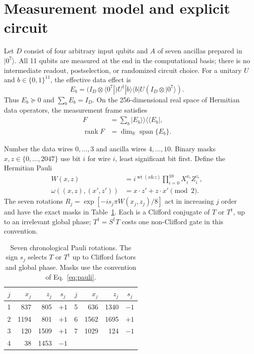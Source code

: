 \documentclass[aps,pra,reprint,floatfix,superscriptaddress,nofootinbib]{revtex4-2}
\newcommand{\rank}{\operatorname{rank}}
\newcommand{\Span}{\operatorname{span}}
\begin{document}
\section{Measurement model and explicit circuit}

Let $D$ consist of four arbitrary input qubits and $A$ of seven ancillas prepared in $|0^7\rangle$. All 11 qubits are measured at the end in the computational basis; there is no intermediate readout, postselection, or randomized circuit choice. For a unitary $U$ and $b\in\{0,1\}^{11}$, the effective data effect is
\begin{equation}
 E_b=(I_D\otimes\langle0^7|)U^\dagger|b\rangle\langle b|U(I_D\otimes|0^7\rangle).
 \label{eq:effect}
\end{equation}
Thus $E_b\succeq0$ and $\sum_bE_b=I_D$. On the 256-dimensional real space of Hermitian data operators, the measurement frame satisfies
\begin{equation}
\begin{aligned}
 F&=\sum_b|E_b\rangle\!\rangle\langle\!\langle E_b|,\\
 \rank F&=\dim_{\mathbb R}\Span\{E_b\}.
\end{aligned}
\label{eq:frame}
\end{equation}

Number the data wires $0,\ldots,3$ and ancilla wires $4,\ldots,10$. Binary masks $x,z\in\{0,\ldots,2047\}$ use bit $i$ for wire $i$, least significant bit first. Define the Hermitian Pauli
\begin{equation}
\begin{aligned}
 W(x,z)&=i^{\operatorname{wt}(x\mathbin{\&}z)}
          \prod_{i=0}^{10}X_i^{x_i}Z_i^{z_i},\\
 \omega((x,z),(x',z'))&=x\!\cdot\!z'+z\!\cdot\!x'\pmod 2 .
\end{aligned}
 \label{eq:pauli}
\end{equation}
The seven rotations $R_j=\exp[-is_j\pi W(x_j,z_j)/8]$ act in increasing $j$ order and have the exact masks in Table~\ref{tab:rotations}. Each is a Clifford conjugate of $T$ or $T^\dagger$, up to an irrelevant global phase; $T^\dagger=S^\dagger T$ costs one non-Clifford gate in this convention.

\begin{table}[t]
\caption{Seven chronological Pauli rotations. The sign $s_j$ selects $T$ or $T^\dagger$ up to Clifford factors and global phase. Masks use the convention of Eq.~\eqref{eq:pauli}.}
\label{tab:rotations}
\begin{ruledtabular}
\begin{tabular}{c r r c@{\qquad}c r r c}
$j$&$x_j$&$z_j$&$s_j$&$j$&$x_j$&$z_j$&$s_j$\\
\hline
1&837&805&$+1$&5&636&1340&$-1$\\
2&1194&801&$+1$&6&1562&1695&$+1$\\
3&120&1509&$+1$&7&1029&124&$-1$\\
4&38&1453&$-1$&&&&
\end{tabular}
\end{ruledtabular}
\end{table}
\end{document}
